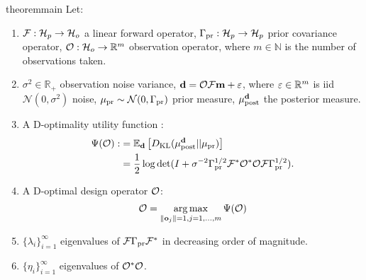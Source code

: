 \begin{restatable}{theorem}{main}\label{thm:char}
  Let:
  \begin{enumerate}
  \item $\mathcal{F}:\mathcal{H}_p \to \mathcal{H}_o$ a linear forward operator,
    $\Gamma_{\textup{pr}}:\mathcal{H}_p \to \mathcal{H}_p$ prior covariance operator, $\mathcal{O}: \mathcal{H}_o
    \to \mathbb{R}^m$ observation operator, where $m \in \mathbb{N}$
    is the number of observations taken.
    \item $\sigma^2 \in \mathbb{R}_{+}$ observation noise variance,
      $\mathbf{d} = \mathcal{O} \mathcal{F} \mathbf{m} + \varepsilon$, where $\varepsilon \in \mathbb{R}^m$
      is iid $\mathcal{N}(0, \sigma^2)$ noise, $\mu_{\textup{pr}} \sim
      \mathcal{N}(0, \Gamma_{\textup{pr}})$ prior measure, $\mu_{\textup{post}}^{\mathbf{d}}$ the posterior
      measure.
  \item A D-optimality utility function
    \cite{AlexanderianGloorGhattas14}:
    \begin{align*}
      \begin{split}
        \tar(\obs) :&= \mathbb{E}_{\data}\left [ D_{\text{KL}} (\post || \pr ) \right ] \\
        &= \frac12 \log \det ( I + \sigma^{-2} \prcov^{1/2} \fwd ^*
        \obs^* \obs \fwd \prcov^{1/2}).
    \end{split}
  \end{align*}
  \item A D-optimal design operator $\mathcal{O}$:
    $$
    \mathcal{O} = \operatorname*{arg\,max}_{\|\mathbf{o}_j\| = 1, j=1,\dots,m}\Psi(\mathcal{O})
    $$ 
  \item $\{\lambda_i\}_{i=1}^\infty$ eigenvalues of $\mathcal{F}\Gamma_{\textup{pr}}\mathcal{F}^*$
    in decreasing order of magnitude.
  \item $\{\eta_i\}_{i=1}^\infty$ eigenvalues of $\mathcal{O}^*\mathcal{O}$.
  \end{enumerate}


\end{restatable}
